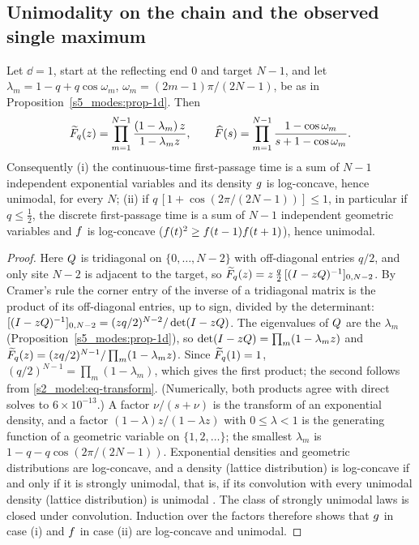 \subsection{Unimodality on the chain and the observed single maximum}

\begin{proposition}\label{s3_methods:prop-1d-unimodal}
Let $\dd=1$, start at the reflecting end $0$ and target $N-1$, and let $\lambda_m=1-q+q\cos\omega_m$,
$\omega_m=(2m-1)\pi/(2N-1)$, be as in Proposition~\ref{s5_modes:prop-1d}. Then
\begin{equation}\label{s3_methods:eq-1d-product}
  \widetilde{F}_q(z)=\prod_{m=1}^{N-1}\frac{(1-\lambda_m)\,z}{1-\lambda_m z},\qquad
  \widehat{F}(s)=\prod_{m=1}^{N-1}\frac{1-\cos\omega_m}{s+1-\cos\omega_m}.
\end{equation}
Consequently (i) the continuous-time first-passage time is a sum of $N-1$ independent exponential variables and
its density $g$ is log-concave, hence unimodal, for every $N$; (ii) if $q\,[1+\cos(2\pi/(2N-1))]\le1$, in
particular if $q\le\tfrac12$, the discrete first-passage time is a sum of $N-1$ independent geometric variables and
$f$ is log-concave ($f(t)^{2}\ge f(t-1)f(t+1)$), hence unimodal.
\end{proposition}

\begin{proof}
Here $Q$ is tridiagonal on $\{0,\dots,N-2\}$ with off-diagonal entries $q/2$, and only site $N-2$ is adjacent to
the target, so $\widetilde{F}_q(z)=z\,\tfrac q2\,[(I-zQ)^{-1}]_{0,N-2}$. By Cramer's rule the corner entry of the inverse of a
tridiagonal matrix is the product of its off-diagonal entries, up to sign, divided by the determinant:
$[(I-zQ)^{-1}]_{0,N-2}=(zq/2)^{N-2}/\det(I-zQ)$. The eigenvalues of $Q$ are the $\lambda_m$
(Proposition~\ref{s5_modes:prop-1d}), so $\det(I-zQ)=\prod_m(1-\lambda_m z)$ and
$\widetilde{F}_q(z)=(zq/2)^{N-1}/\prod_m(1-\lambda_m z)$. Since $\widetilde{F}_q(1)=1$, $(q/2)^{N-1}=\prod_m(1-\lambda_m)$, which gives
the first product; the second follows from \eqref{s2_model:eq-transform}. (Numerically, both products agree with
direct solves to $6\times10^{-13}$.)
A factor $\nu/(s+\nu)$ is the transform of an exponential density, and a factor $(1-\lambda)z/(1-\lambda z)$ with
$0\le\lambda<1$ is the generating function of a geometric variable on $\{1,2,\dots\}$; the smallest $\lambda_m$ is
$1-q-q\cos(2\pi/(2N-1))$. Exponential densities and geometric distributions are log-concave, and a density (lattice
distribution) is log-concave if and only if it is strongly unimodal, that is, if its convolution with every unimodal
density (lattice distribution) is unimodal \citep{Ibragimov1956,KeilsonGerber1971}. The class of strongly unimodal
laws is closed under convolution. Induction over the factors therefore shows that $g$ in case (i) and $f$ in case
(ii) are log-concave and unimodal.
\end{proof}

